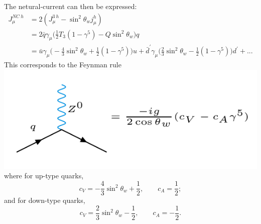 The netural-current can then be expressed:
\begin{equation}
\begin{split}
J_\mu^{NC\ h} &= 2 (J_\mu^{3\ h} - \sin^2\theta_w j_\mu^h) \\
&= 2 \bar{q} \gamma_\mu \bigg(\frac{1}{2} T_3 (1-\gamma^5) - Q \sin^2\theta_w \bigg) q \\
&= \bar{u} \gamma_\mu \bigg( -\frac{4}{3}\sin^2\theta_w + \frac{1}{2}(1-\gamma^5)\bigg) u + \bar{d}^\prime \gamma_\mu \bigg(\frac{2}{3} \sin^2\theta_w - \frac{1}{2}(1 - \gamma^5) \bigg) d^\prime + ...
\end{split}
\end{equation}
This corresponds to the Feynman rule
\newline
  \includegraphics[width=0.7\linewidth]{figs/27a.png}
\newline
where for up-type quarks,
\begin{equation}
c_V = -\frac{4}{3}\sin^2\theta_w + \frac{1}{2}, \qquad c_A = \frac{1}{2};
\end{equation}
and for down-type quarks,
\begin{equation}
c_V = \frac{2}{3}\sin^2\theta_w - \frac{1}{2}, \qquad c_A = -\frac{1}{2}.
\end{equation}
%

